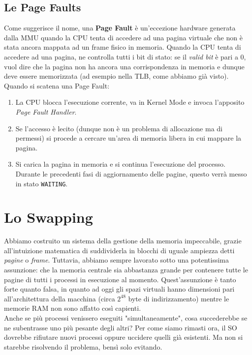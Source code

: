 \documentclass[12pt]{report}
\begin{document}
	\subsection{Le Page Faults}
	Come suggerisce il nome, una \textbf{Page Fault} è un'eccezione hardware generata dalla MMU quando la CPU tenta di accedere ad una pagina virtuale che non è stata ancora mappata ad un frame fisico in memoria. Quando la CPU tenta di accedere ad una pagina, ne controlla tutti i bit di stato: se il \textit{valid bit} è pari a 0, vuol dire che la pagina non ha ancora una corrispondenza in memoria e dunque deve essere memorizzata (ad esempio nella TLB, come abbiamo già visto).\\
	Quando si scatena una Page Fault:
	\begin{enumerate}
		\item La CPU blocca l'esecuzione corrente, va in Kernel Mode e invoca l'apposito \textit{Page Fault Handler}.
		
		\item Se l'accesso è lecito (dunque non è un problema di allocazione ma di permessi) si procede a cercare un'area di memoria libera in cui mappare la pagina.
		
		\item Si carica la pagina in memoria e si continua l'esecuzione del processo. Durante le precedenti fasi di aggiornamento delle pagine, questo verrà messo in stato \texttt{WAITING}.
	\end{enumerate}
	
	\section{Lo Swapping}
	Abbiamo costruito un sistema della gestione della memoria impeccabile, grazie all'intuizione matematica di suddividerla in blocchi di uguale ampiezza detti \textit{pagine} o \textit{frame}. Tuttavia, abbiamo sempre lavorato sotto una potentissima assunzione: che la memoria centrale sia abbastanza grande per contenere tutte le pagine di tutti i processi in esecuzione al momento. Quest'assunzione è tanto forte quanto falsa, in quanto ad oggi gli spazi virtuali hanno dimensioni pari all'architettura della macchina (circa $2^{48}$ byte di indirizzamento) mentre le memorie RAM non sono affatto così capienti.\\
	Anche se più processi venissero eseguiti "simultaneamente", cosa succederebbe se ne subentrasse uno più pesante degli altri? Per come siamo rimasti ora, il SO dovrebbe rifiutare nuovi processi oppure uccidere quelli già esistenti. Ma non si starebbe risolvendo il problema, bensì solo evitando.
	\smallbreak
	
\end{document}
